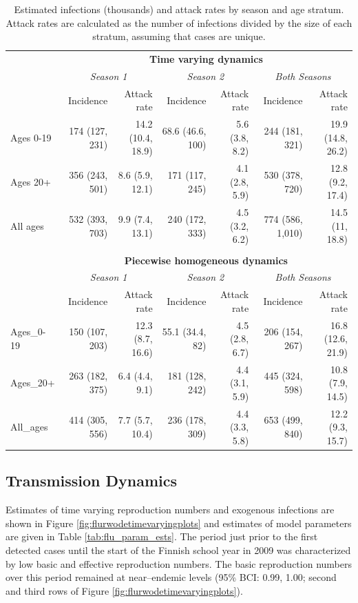 \begin{table}
	\caption{Estimated infections (thousands) and attack rates by season and age stratum. Attack rates are calculated as the number of infections divided by the size of each stratum, assuming that cases are unique.}
	\label{tab:flu_attack_rates}
	\centering\footnotesize
	\begin{tabular}{lrrrrrr}
		\hline
		&\multicolumn{6}{c}{\textbf{Time varying dynamics}}\\
		\cmidrule{2-7} & \multicolumn{2}{c}{\textit{Season 1}} & \multicolumn{2}{c}{\textit{Season 2}} & \multicolumn{2}{c}{\textit{Both Seasons}}\\
		\cmidrule(r){2-3}\cmidrule(lr){4-5}\cmidrule(l){6-7} & 
		Incidence & Attack rate & Incidence & Attack rate & Incidence & Attack rate \\
		\hline
	Ages 0-19 & 174 (127, 231) & 14.2 (10.4, 18.9) & 68.6 (46.6, 100) & 5.6 (3.8, 8.2) & 244 (181, 321) & 19.9 (14.8, 26.2)\\
	Ages 20+ & 356 (243, 501) & 8.6 (5.9, 12.1) & 171 (117, 245) & 4.1 (2.8, 5.9) & 530 (378, 720) & 12.8 (9.2, 17.4)\\
	All ages & 532 (393, 703) & 9.9 (7.4, 13.1) & 240 (172, 333) & 4.5 (3.2, 6.2) & 774 (586, 1,010) & 14.5 (11, 18.8)\\
		\hline &&&&&&\\
		&\multicolumn{6}{c}{\textbf{Piecewise homogeneous dynamics}}\\
		\cmidrule{2-7}	& \multicolumn{2}{c}{\textit{Season 1}} & \multicolumn{2}{c}{\textit{Season 2}} & \multicolumn{2}{c}{\textit{Both Seasons}}\\
	\cmidrule(r){2-3}\cmidrule(lr){4-5}\cmidrule(l){6-7} & 
	Incidence & Attack rate & Incidence & Attack rate & Incidence & Attack rate \\
	\hline
	Ages\_0-19 & 150 (107, 203) & 12.3 (8.7, 16.6) & 55.1 (34.4, 82) & 4.5 (2.8, 6.7) & 206 (154, 267) & 16.8 (12.6, 21.9)\\
	\hline
	Ages\_20+ & 263 (182, 375) & 6.4 (4.4, 9.1) & 181 (128, 242) & 4.4 (3.1, 5.9) & 445 (324, 598) & 10.8 (7.9, 14.5)\\
	\hline
	All\_ages & 414 (305, 556) & 7.7 (5.7, 10.4) & 236 (178, 309) & 4.4 (3.3, 5.8) & 653 (499, 840) & 12.2 (9.3, 15.7)\\
		\hline
	\end{tabular}
\end{table}

\subsection{Transmission Dynamics}
\label{flu_res_dynamics}
Estimates of time varying reproduction numbers and exogenous infections are shown in Figure \ref{fig:flurwodetimevaryingplots} and estimates of model parameters are given in Table \ref{tab:flu_param_ests}. The period just prior to the first detected cases until the start of the Finnish school year in 2009 was characterized by low basic and effective reproduction numbers. The basic reproduction numbers over this period remained at near--endemic levels (95\% BCI: 0.99, 1.00; second and third rows of Figure \ref{fig:flurwodetimevaryingplots}). 

